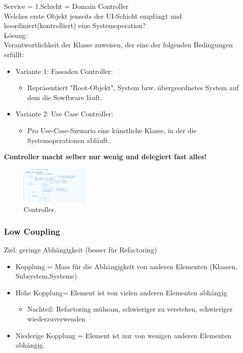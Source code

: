 \documentclass[../ZF_SWEN1.tex]{subfiles}
\begin{document}
Service = 1.Schicht = Domain Controller\\
Welches erste Objekt jenseits der UI-Schicht empfängt und koordiniert(kontrolliert) eine Systemoperation?\\
Lösung:\\
Verantwortlichkeit der Klasse zuweisen, der eine der folgenden Bedingungen erfüllt:\\
\begin{itemize}
	\item Variante 1: Fassaden Controller:
	\begin{itemize}
		\item Repräsentiert "Root-Objekt", System bzw. übergeordnetes System auf dem die Sowftware läuft.
	\end{itemize}
	\item Variante 2: Use Case Controller:
	\begin{itemize}
		\item Pro Use-Case-Szenario eine künstliche Klasse, in der die Systemoperationen abläuft.
	\end{itemize}
\end{itemize}

\textbf{{\large Controller macht selber nur wenig und delegiert fast alles!}}

\begin{figure} [H]
\centering
\includegraphics[width=0.3\textwidth]{Resources/Images/Controller.png}
\caption{\label{fig:Controller}Controller.}

\end{figure}


\subsubsection{Low Coupling}

Ziel: geringe Abhängigkeit (besser für Refactoring)
\begin{itemize}
	\item Kopplung = Mass für die Abhängigkeit von anderen Elementen (Klassen, Subsystem,Systeme)
	\item Hohe Kopplung= Element ist von vielen anderen Elementen abhängig
	\begin{itemize}
		\item Nachteil: Refactoring mühsam, schwieriger zu verstehen, schwieriger wiederzuverwenden
		
	\end{itemize}
	\item Niederige Kopplung = Element ist nur von wenigen anderen Elementen abhängig.
\end{itemize}
\end{document}

